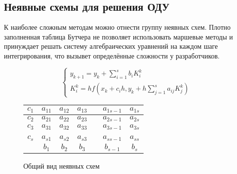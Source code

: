 \subsection{Неявные схемы для решения ОДУ}

К наиболее сложным методам можно отнести группу неявных схем. Плотно заполненная таблица Бутчера не позволяет использовать маршевые
методы и принуждает решать систему алгебраических уравнений на каждом шаге интегрирования, что вызывет определённые сложности у
разработчиков.


\begin{figure}
    \begin{minipage}[t]{8.5cm}
        {\small
        \begin{equation*}
            \begin{cases}
                y_{k + 1} = y_k + \sum\limits_{i = 1}^sb_iK_i^k\\
                K_i^k = hf(x_k + c_ih, y_k + h\sum\limits_{j = 1}^{s}a_{ij}K_j^k)
            \end{cases}
        \end{equation*}
        }
    \end{minipage}
    \begin{minipage}[t]{7.5cm}
        \begin{table}    
            \begin{tabular}{|c|c|c|c|c|c|c|}
            \hline
            $c_1$ & $a_{11}$ & $a_{12}$ & $a_{13}$ & & $a_{1s-1}$ & $a_{1s}$\\
            \hline
            $c_2$ & $a_{21}$ & $a_{22}$ & $a_{23}$ & & $a_{2s-1}$ & $a_{2s}$\\
            \hline
            $c_3$ & $a_{31}$ & $a_{32}$ & $a_{33}$ & & $a_{3s-1}$ & $a_{3s}$\\
            \hline
            & & & & & &\\
            \hline
            $c_s$ & $a_{s1}$ & $a_{s2}$ & $a_{s3}$ & & $a_{ss-1}$ & $a_{ss}$\\
            \hline
            & \cellcolor{lightgray} $b_1$ & \cellcolor{lightgray} $b_2$ & \cellcolor{lightgray} $b_3$ & \cellcolor{lightgray} & \cellcolor{lightgray} $b_{s-1}$ &  \cellcolor{lightgray} $b_s$\\
            \hline
            \end{tabular}
        \end{table}
    \end{minipage}
    \caption{Общий вид неявных схем}
    \label{fig:Gauss}
\end{figure}

